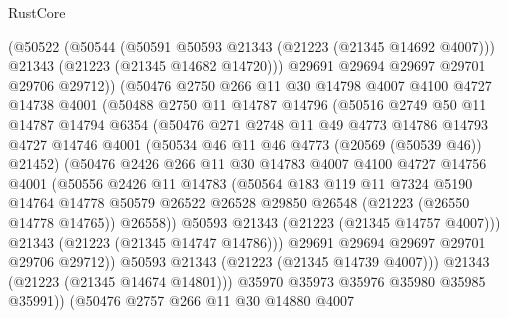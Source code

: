 \begin{lexlean}{RustCore}
\begin{coremodule}
            (@50522
              (@50544
                (@50591 @50593 @21343 (@21223 (@21345 @14692 @4007)))
                @21343
                (@21223 (@21345 @14682 @14720)))
              @29691
              @29694
              @29697
              @29701
              @29706
              @29712))
          (@50476
            @2750
            @266
            @11
            @30
            @14798
            @4007
            @4100
            @4727
            @14738
            @4001
            (@50488
              @2750
              @11
              @14787
              @14796
              (@50516
                @2749
                @50
                @11
                @14787
                @14794
                @6354
                (@50476
                  @271
                  @2748
                  @11
                  @49
                  @4773
                  @14786
                  @14793
                  @4727
                  @14746
                  @4001
                  (@50534 @46 @11 @46 @4773 (@20569 (@50539 @46)) @21452)
                  (@50476
                    @2426
                    @266
                    @11
                    @30
                    @14783
                    @4007
                    @4100
                    @4727
                    @14756
                    @4001
                    (@50556
                      @2426
                      @11
                      @14783
                      (@50564
                        @183
                        @119
                        @11
                        @7324
                        @5190
                        @14764
                        @14778
                        @50579
                        @26522
                        @26528
                        @29850
                        @26548
                        (@21223 (@26550 @14778 @14765))
                        @26558))
                    @50593
                    @21343
                    (@21223 (@21345 @14757 @4007)))
                  @21343
                  (@21223 (@21345 @14747 @14786)))
                @29691
                @29694
                @29697
                @29701
                @29706
                @29712))
            @50593
            @21343
            (@21223 (@21345 @14739 @4007)))
          @21343
          (@21223 (@21345 @14674 @14801)))
        @35970
        @35973
        @35976
        @35980
        @35985
        @35991))
    (@50476
      @2757
      @266
      @11
      @30
      @14880
      @4007

\end{coremodule}
\end{lexlean}
